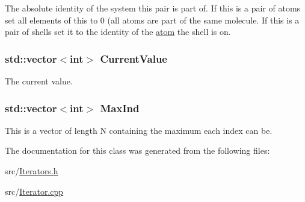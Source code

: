 The absolute identity of the system this pair is part of. If this is a pair of atoms set all elements of this to 0 (all atoms are part of the same molecule. If this is a pair of shells set it to the identity of the \hyperlink{classJKBuilder_1_1atom}{atom} the shell is on. \hypertarget{classJKBuilder_1_1Iterator_a20ca24f6d827aba144bb087c4bcb74a0}{
\subsubsection[{CurrentValue}]{\setlength{\rightskip}{0pt plus 5cm}std::vector$<$int$>$ {\bf CurrentValue}}}
\label{classJKBuilder_1_1Iterator_a20ca24f6d827aba144bb087c4bcb74a0}


The current value. \hypertarget{classJKBuilder_1_1Iterator_ab6b56d3c4e9353bc938dd6249cde9ca0}{
\subsubsection[{MaxInd}]{\setlength{\rightskip}{0pt plus 5cm}std::vector$<$int$>$ {\bf MaxInd}}}
\label{classJKBuilder_1_1Iterator_ab6b56d3c4e9353bc938dd6249cde9ca0}


This is a vector of length N containing the maximum each index can be. 

The documentation for this class was generated from the following files:\begin{DoxyCompactItemize}
\item 
src/\hyperlink{Iterators_8h}{Iterators.h}\item 
src/\hyperlink{Iterator_8cpp}{Iterator.cpp}\end{DoxyCompactItemize}
